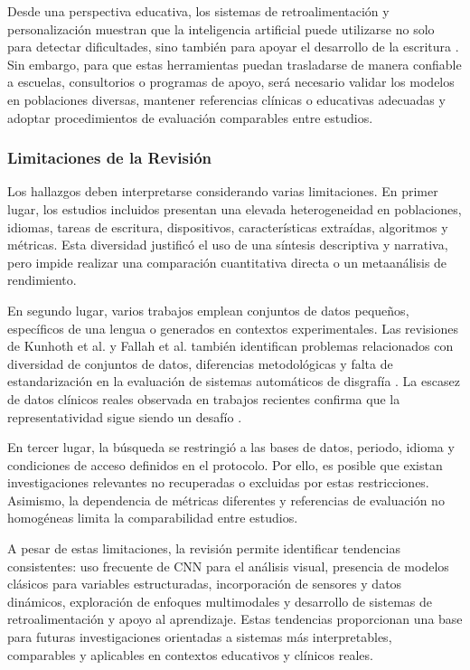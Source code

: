 \documentclass{iaesarticle}
\begin{document}
Desde una perspectiva educativa, los sistemas de retroalimentación y
personalización muestran que la inteligencia artificial puede utilizarse no
solo para detectar dificultades, sino también para apoyar el desarrollo de la
escritura \cite{Villegas-Ch2024,Aitymova2025,Opu2022}. Sin embargo, para que
estas herramientas puedan trasladarse de manera confiable a escuelas,
consultorios o programas de apoyo, será necesario validar los modelos en
poblaciones diversas, mantener referencias clínicas o educativas adecuadas y
adoptar procedimientos de evaluación comparables entre estudios.

\subsubsection{Limitaciones de la Revisión}

Los hallazgos deben interpretarse considerando varias limitaciones. En primer
lugar, los estudios incluidos presentan una elevada heterogeneidad en
poblaciones, idiomas, tareas de escritura, dispositivos, características
extraídas, algoritmos y métricas. Esta diversidad justificó el uso de una
síntesis descriptiva y narrativa, pero impide realizar una comparación
cuantitativa directa o un metaanálisis de rendimiento.

En segundo lugar, varios trabajos emplean conjuntos de datos pequeños,
específicos de una lengua o generados en contextos experimentales. Las
revisiones de Kunhoth et al. y Fallah et al. también identifican problemas
relacionados con diversidad de conjuntos de datos, diferencias metodológicas y
falta de estandarización en la evaluación de sistemas automáticos de disgrafía
\cite{Kunhoth2024,Fallah2025}. La escasez de datos clínicos reales observada en
trabajos recientes confirma que la representatividad sigue siendo un desafío
\cite{Namitha2026,Rangasrinivasan2025}.

En tercer lugar, la búsqueda se restringió a las bases de datos, periodo,
idioma y condiciones de acceso definidos en el protocolo. Por ello, es posible
que existan investigaciones relevantes no recuperadas o excluidas por estas
restricciones. Asimismo, la dependencia de métricas diferentes y referencias
de evaluación no homogéneas limita la comparabilidad entre estudios.

A pesar de estas limitaciones, la revisión permite identificar tendencias
consistentes: uso frecuente de CNN para el análisis visual, presencia de
modelos clásicos para variables estructuradas, incorporación de sensores y
datos dinámicos, exploración de enfoques multimodales y desarrollo de sistemas
de retroalimentación y apoyo al aprendizaje.
Estas tendencias proporcionan una base para futuras investigaciones orientadas
a sistemas más interpretables, comparables y aplicables en contextos
educativos y clínicos reales.
\end{document}
